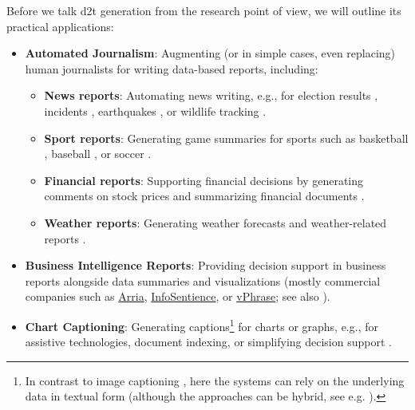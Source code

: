 {Before we talk \ac{d2t} generation from the research point of view, we will outline its practical applications:

\begin{itemize}
  \item \textbf{Automated Journalism}: Augmenting (or in simple cases, even replacing) human journalists for writing data-based reports, including:
        \begin{itemize}
          \item \textbf{News reports}: Automating news writing, e.g., for election results \cite{leppanen2017data}, incidents \cite{vanderleeCACAPODatasetMultilingual2020}, earthquakes \cite{oremus2014first}, or wildlife tracking \cite{siddharthan2012blogging,ponnamperuma2013tag2blog}.
          \item \textbf{Sport reports}: Generating game summaries for sports such as basketball \cite{wiseman2017challenges,thomson2020sportsett}, baseball \cite{puduppullyDatatotextGenerationEntity2019}, or soccer \cite{van2017pass}.
          \item \textbf{Financial reports}: Supporting financial decisions by generating comments on stock prices \cite{murakami2017learning,aoki2018generating} and summarizing financial documents \cite{chapman2022towards}.
          \item \textbf{Weather reports}: Generating weather forecasts and weather-related reports \cite{goldberg1994using,belz2005corpus,belz2008automatic,angeli-etal-2010-simple,balakrishnan2019constrained}.
        \end{itemize}
  \item \textbf{Business Intelligence Reports}: Providing decision support in business reports alongside data summaries and visualizations (mostly commercial companies such as \href{https://www.arria.com}{Arria}, \href{https://infosentience.com}{InfoSentience}, or \href{https://www.vphrase.com}{vPhrase}; see also \citealp{perlitz2023nbiig}).
  \item \textbf{Chart Captioning}: Generating captions\footnote{In contrast to image captioning \cite{stefanini2022show}, here the systems can rely on the underlying data in textual form (although the approaches can be hybrid, see e.g. \citealp{kantharajCharttoTextLargeScaleBenchmark2022}).} for charts or graphs, e.g., for assistive technologies, document indexing, or simplifying decision support \cite{demirGeneratingTextualSummaries2008,demirSummarizingInformationGraphics2012,obeidCharttoTextGeneratingNatural2020,kantharajCharttoTextLargeScaleBenchmark2022}.

\end{itemize}}
